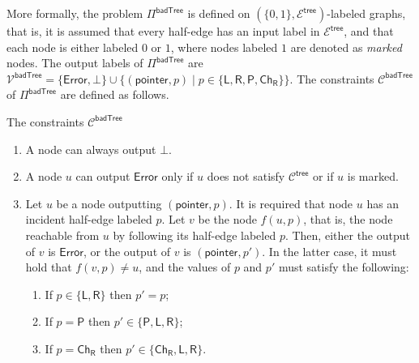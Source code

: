 \documentclass[11pt]{article}
\newcommand{\lparent}{\mathsf {P}}
\newcommand{\lleft}{\mathsf {L}}
\newcommand{\lright}{\mathsf {R}}
\newcommand{\lrch}{\ensuremath{\mathsf {Ch_R}}}
\newcommand{\lerror}{\mathsf {Error}}
\newcommand{\ltreelike}{\mathsf {tree}}
\newcommand{\lpointer}{\mathsf {pointer}}
\newcommand{\lbadtree}{\mathsf {badTree}}
\begin{document}
More formally, the problem $\Pi^{\lbadtree}$ is defined on $(\{0,1\},\mathcal{E^\ltreelike})$-labeled graphs, that is, it is assumed that every half-edge has an input label in $\mathcal{E^\ltreelike}$, and that each node is either labeled $0$ or $1$, where nodes labeled $1$ are denoted as \emph{marked} nodes.
The output labels of $\Pi^{\lbadtree}$ are $\mathcal{V^\lbadtree} = \{\lerror, \bot\} \cup \{ (\lpointer,p) \mid p \in \{\lleft,\lright, \lparent,\lrch\} \}$. The constraints $\mathcal{C}^{\lbadtree}$ of $\Pi^{\lbadtree}$ are defined as follows.

\begin{myframe}{The constraints $\mathcal{C}^{\lbadtree}$}
\begin{enumerate}
	\item A node can always output $\bot$.\label{constr:pibad-bot}
	\item A node $u$ can output $\lerror$ only if $u$ does not satisfy $\mathcal{C}^{\ltreelike}$ or if $u$ is marked.\label{constr:noerror}
	\item Let $u$ be a node outputting $(\lpointer,p)$. It is required that node $u$ has an incident half-edge labeled $p$. Let $v$ be the node $f(u,p)$, that is, the node reachable from $u$ by following its half-edge labeled $p$. Then, either the output of $v$ is $\lerror$, or the output of $v$ is $(\lpointer,p')$. In the latter case, it must hold that $f(v,p) \neq u$, and the values of $p$ and $p'$ must satisfy the following:\label{constr:pointers}
	\begin{enumerate}
		\item If $p \in\{\lleft, \lright\} $ then $p' = p$;
		\item If $p = \lparent$ then $p' \in \{\lparent, \lleft,\lright\}$;
		\item If $p = \lrch$ then $p' \in \{\lrch, \lleft, \lright\}$.
	\end{enumerate}
\end{enumerate}
\end{myframe}
\end{document}
